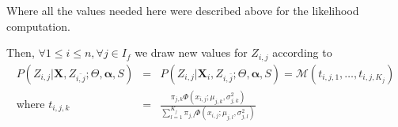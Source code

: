 \documentclass[11pt,a4paper]{report}
\begin{document}
			Where all the values needed here were described above for the likelihood computation.

	Then, $\forall 1\leq i \leq n, \forall j \in I_f$ we draw new values for $Z_{i,j}$ according to
	\begin{eqnarray}
		P(Z_{i,j}|\boldsymbol{X},Z_{\bar{i,j}};\Theta,\boldsymbol{\alpha},S)&=&P(Z_{i,j}|\boldsymbol{X}_i,Z_{i,\bar{j}};\Theta,\boldsymbol{\alpha},S)=\mathcal{M}(t_{i,j,1},\dots ,t_{i,j,K_j}) \\
		\textrm{where } t_{i,j,k}&=&\frac{\pi_{j,k}\Phi(x_{i,j};\mu_{j,k},\sigma_{j,k}^2)}{\sum_{l=1}^{K_j}\pi_{j,l}\Phi(x_{i,j};\mu_{j,l},\sigma_{j,l}^2) }
	\end{eqnarray}
		
\end{document}
